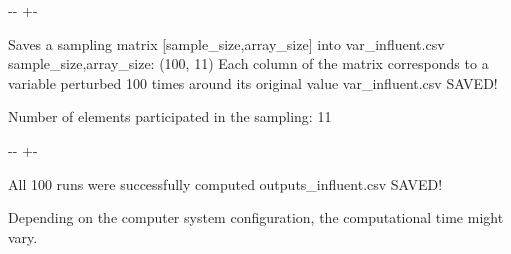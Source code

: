 \documentclass[a4paper,10pt,english]{sphinxmanual}
\newlength\nbsphinxcodecellspacing
\begin{document}
{

\kern-\sphinxverbatimsmallskipamount\kern-\baselineskip
\kern+\FrameHeightAdjust\kern-\fboxrule
\vspace{\nbsphinxcodecellspacing}

\begin{sphinxVerbatim}[commandchars=\\\{\}]
Saves a sampling matrix [sample\_size,array\_size] into var\_influent.csv
sample\_size,array\_size:  (100, 11)
Each column of the matrix corresponds to a variable perturbed 100 times around its original value
var\_influent.csv SAVED!

Number of elements participated in the sampling: 11
\end{sphinxVerbatim}
}

{
\begin{sphinxVerbatim}[commandchars=\\\{\}]
\llap{\color{nbsphinxin}[6]:\,\hspace{\fboxrule}\hspace{\fboxsep}}
\end{sphinxVerbatim}
}

{

\kern-\sphinxverbatimsmallskipamount\kern-\baselineskip
\kern+\FrameHeightAdjust\kern-\fboxrule
\vspace{\nbsphinxcodecellspacing}

\begin{sphinxVerbatim}[commandchars=\\\{\}]
All 100 runs were successfully computed
outputs\_influent.csv SAVED!
\end{sphinxVerbatim}
}

\sphinxAtStartPar
{} Depending on the computer system configuration, the computational time might vary.
\end{document}
